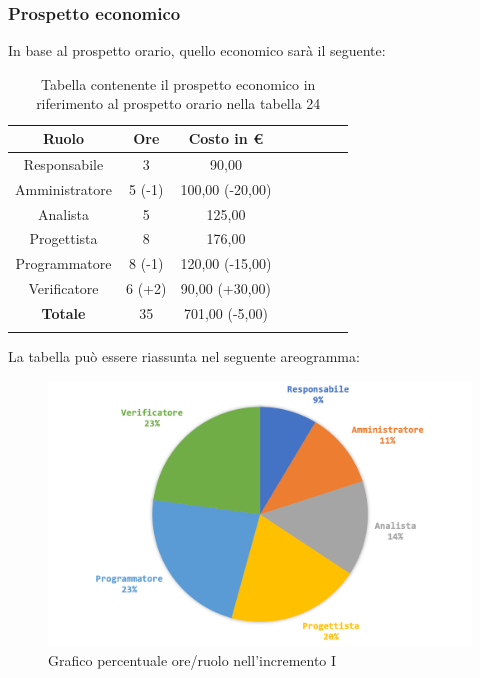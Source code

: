 		\subsubsection{Prospetto economico}
			In base al prospetto orario, quello economico sarà il seguente: 
			
			\begin{longtable}{|c|c|c|c|c|c|c|c}
				\hline
				\rowcolor{lighter-grayer}
				\textbf{Ruolo} & \textbf{Ore} & \textbf{Costo in €} \\
				\hline
				\endfirsthead
				\hline
			Responsabile 	    & 3 & 90,00\\
			\hline 
			\hline
			Amministratore	  & 5 (-1)& 100,00 (-20,00)\\
			\hline
			\hline
			Analista 				& 5 & 125,00\\
			\hline
			\hline
			Progettista 		  & 8 & 176,00\\
			\hline
			\hline
			Programmatore 	 & 8 (-1)& 120,00 (-15,00)\\
			\hline
			\hline
			Verificatore 		  & 6 (+2) & 90,00 (+30,00)\\
			\hline
			\textbf{Totale} 	& 35 & 701,00 (-5,00)\\
			\hline
				
				\caption{Tabella contenente il prospetto economico in riferimento al prospetto orario nella tabella 24}
			\end{longtable}
			\pagebreak
			
			La tabella può essere riassunta nel seguente areogramma:
			\begin{figure}[H]
				\centering
				\includegraphics[width=0.8\linewidth]{images/consuntivo/ConsIncr1-2.png}
				\caption{Grafico percentuale ore/ruolo nell'incremento I}
				\label{fig:grafico costi ruolo incremento I}
			\end{figure}
		

